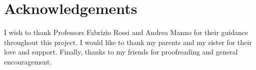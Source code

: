 \section*{Acknowledgements}
I wish to thank Professors Fabrizio Rossi and Andrea Manno for their guidance throughout this project. 
I would like to thank my parents and my sister for their love and support. Finally, thanks to my friends for proofreading and general encouragement.